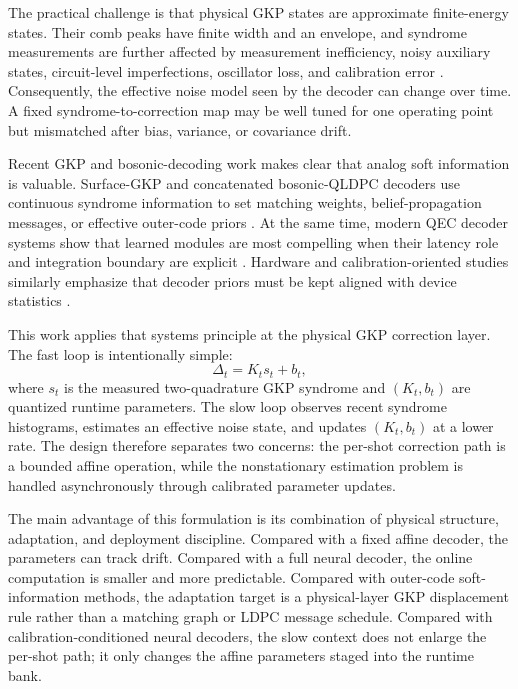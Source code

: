 \documentclass[11pt]{article}
\begin{document}
The practical challenge is that physical GKP states are approximate
finite-energy states.  Their comb peaks have finite width and an envelope, and
syndrome measurements are further affected by measurement inefficiency, noisy
auxiliary states, circuit-level imperfections, oscillator loss, and calibration
error \cite{grimsmo2021,roy2025}.  Consequently, the effective noise model seen
by the decoder can change over time.  A fixed syndrome-to-correction map may be
well tuned for one operating point but mismatched after bias, variance, or
covariance drift.

Recent GKP and bosonic-decoding work makes clear that analog soft information
is valuable.  Surface-GKP and concatenated bosonic-QLDPC decoders use
continuous syndrome information to set matching weights, belief-propagation
messages, or effective outer-code priors \cite{noh2020,noh2022,raveendran2022,
berent2024,borah2025}.  At the same time, modern QEC decoder systems show that
learned modules are most compelling when their latency role and integration
boundary are explicit \cite{chamberland2026,stein2026}.  Hardware and
calibration-oriented studies similarly emphasize that decoder priors must be
kept aligned with device statistics \cite{spitz2018,wagner2021,dgr2023,
chen2022,sivak2024}.

This work applies that systems principle at the physical GKP correction layer.
The fast loop is intentionally simple:
\begin{equation}
    \Delta_t = K_t s_t + b_t ,
\end{equation}
where \(s_t\) is the measured two-quadrature GKP syndrome and
\((K_t,b_t)\) are quantized runtime parameters.  The slow loop observes recent
syndrome histograms, estimates an effective noise state, and updates
\((K_t,b_t)\) at a lower rate.  The design therefore separates two concerns:
the per-shot correction path is a bounded affine operation, while the
nonstationary estimation problem is handled asynchronously through calibrated
parameter updates.

The main advantage of this formulation is its combination of physical
structure, adaptation, and deployment discipline.  Compared with a fixed
affine decoder, the parameters can track drift.  Compared with a full neural
decoder, the online computation is smaller and more predictable.  Compared
with outer-code soft-information methods, the adaptation target is a
physical-layer GKP displacement rule rather than a matching graph or LDPC
message schedule.  Compared with calibration-conditioned neural decoders, the
slow context does not enlarge the per-shot path; it only changes the affine
parameters staged into the runtime bank.
\end{document}
